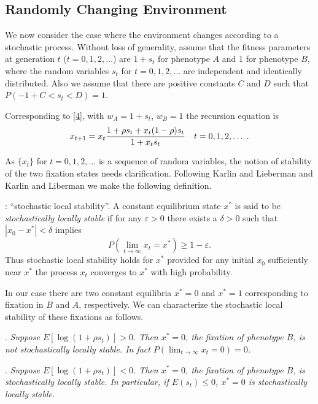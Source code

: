 \documentclass[9pt,twocolumn,twoside,lineno]{pnas-new}
\newcommand{\var}{\varepsilon}
\begin{document}
 
\subsection{Randomly Changing Environment}
 
 We now consider the  case where the environment changes according to a stochastic process. Without loss of generality, assume that the fitness parameters at generation $t$ ($t=0,1,2,\dots$) are $1+s_t$ for phenotype $A$ and $1$ for phenotype $B$, where the random variables $s_t$ for $t=0,1,2,\dots$ are independent and identically distributed. Also we assume that there are positive constants $C$ and $D$ such that $P(-1+C<s_t <D)=1$.
 
 Corresponding to \eqref{4}, with $w_A=1+s_t$, $w_B=1$ the recursion equation is
 \begin{equation}
 x_{t+1}=x_t {1+\rho s_t +x_t(1-\rho)s_t\over 1+x_ts_t}\quad t=0,1,2,\dots\; .\label{28}\end{equation}
 
\noindent As $\{x_t\}$ for $t=0,1,2,\dots$ is a sequence of random variables, the notion of stability of the two fixation states needs clarification. Following Karlin and Lieberman \cite{karlin1974random} and Karlin and Liberman \cite{karlin1975random} we make the following definition.
 \medskip
 
 : ``stochastic local stability''.
 A constant equilibrium state $x^*$ is said to be {\sl stochastically locally stable} if for any $\var>0$ there exists a $\delta>0$ such that $|x_0-x^*|<\delta$ implies
 \begin{equation}
 P\left(\lim_{t\to\infty}x_t =x^*\right)\ge 1-\var.\label{29}\end{equation}
 Thus stochastic local stability holds for $x^*$ provided for any initial $x_0$ sufficiently near $x^*$ the process $x_t$ converges to $x^*$ with high probability.
 
 In our case there are two constant equilibria $x^*=0$ and $x^*=1$ corresponding to fixation in $B$ and $A$, respectively. We can characterize the stochastic local stability of these fixations as follows.
 \medskip
 
 . {\sl Suppose $E\left[\log (1+\rho s_t)\right]>0$. Then $x^*=0$, the fixation of phenotype $B$, is not stochastically locally stable. In fact $P\left(\lim_{t\to\infty}x_t=0\right)=0$.}
 \medskip
 
  . {\sl Suppose $E[\log(1+\rho s_t)]<0$. Then $x^*=0$, the fixation of phenotype $B$, is stochastically locally stable. In particular, if $E(s_t)\le 0$, $x^*=0$ is stochastically locally stable.}
\smallskip
 
\end{document}
